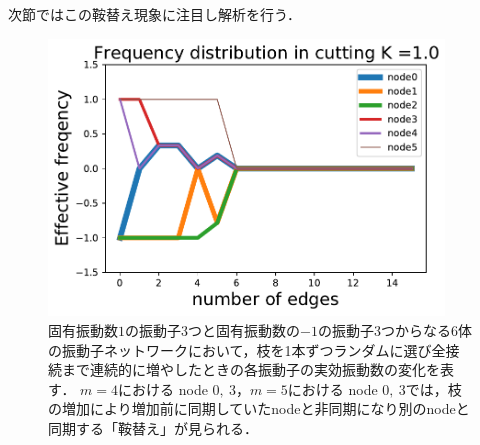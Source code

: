 \documentclass[../main]{subfiles}
\begin{document}
次節ではこの鞍替え現象に注目し解析を行う．
\begin{figure}[tbp]
\centering
\includegraphics[width=105mm]{./images/cutting_N6K10.pdf}
\centering
\caption{固有振動数$1$の振動子3つと固有振動数の$-1$の振動子3つからなる6体の振動子ネットワークにおいて，枝を1本ずつランダムに選び全接続まで連続的に増やしたときの各振動子の実効振動数の変化を表す．
$m=4$における node $0,\ 3$，$m=5$における node $0,\ 3$では，枝の増加により増加前に同期していたnodeと非同期になり別のnodeと同期する「鞍替え」が見られる．}
\label{fig:cutting_N6K1}
\end{figure}
\end{document}
